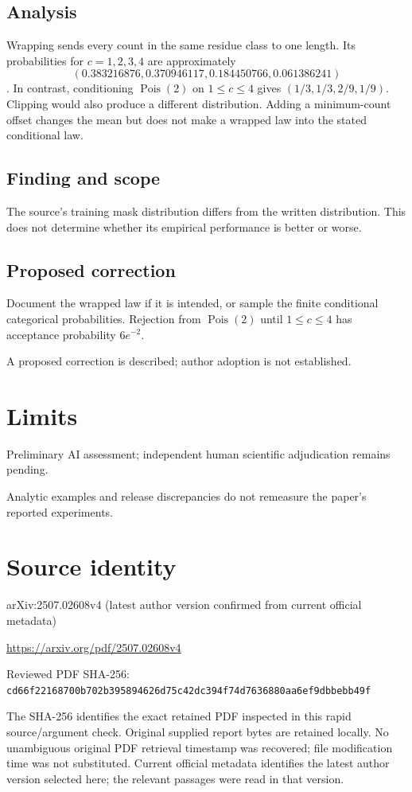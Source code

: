 \documentclass[11pt]{article}
\begin{document}
\subsection*{Analysis}

Wrapping sends every count in the same residue class to one length. Its probabilities for \(c=1,2,3,4\) are approximately \[(0.383216876,0.370946117,0.184450766,0.061386241)\]. In contrast, conditioning \(\operatorname{Pois}(2)\) on \(1\le c\le4\) gives \((1/3,1/3,2/9,1/9)\). Clipping would also produce a different distribution. Adding a minimum-count offset changes the mean but does not make a wrapped law into the stated conditional law.

\subsection*{Finding and scope}

The source’s training mask distribution differs from the written distribution. This does not determine whether its empirical performance is better or worse.

\subsection*{Proposed correction}

Document the wrapped law if it is intended, or sample the finite conditional categorical probabilities. Rejection from \(\operatorname{Pois}(2)\) until \(1\le c\le4\) has acceptance probability \(6e^{-2}\).

A proposed correction is described; author adoption is not established.

\section*{Limits}

Preliminary AI assessment; independent human scientific adjudication remains pending.\par

Analytic examples and release discrepancies do not remeasure the paper’s reported experiments.\par

\section*{Source identity}

arXiv:2507.02608v4 (latest author version confirmed from current official metadata)

\url{https://arxiv.org/pdf/2507.02608v4}

Reviewed PDF SHA-256: \nolinkurl{cd66f22168700b702b395894626d75c42dc394f74d7636880aa6ef9dbbebb49f}

The SHA-256 identifies the exact retained PDF inspected in this rapid source/argument check. Original supplied report bytes are retained locally. No unambiguous original PDF retrieval timestamp was recovered; file modification time was not substituted. Current official metadata identifies the latest author version selected here; the relevant passages were read in that version.
\end{document}
